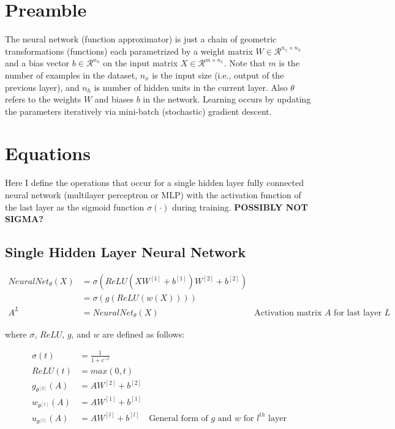 \documentclass{article}
\begin{document}
\section{Preamble}
The neural network
(function approximator) is just a chain of geometric transformations (functions)
each parametrized by a weight matrix $W \in \mathcal{R}^{n_x \times n_h}$ and
a bias vector $b \in \mathcal{R}^{n_h}$ on the input matrix $X \in \mathcal{R}^{m \times n_x}$.
Note that $m$ is the number of examples
in the dataset, $n_x$ is the input size (i.e., output of the previous layer),
and $n_h$ is number of hidden units in the current layer. Also $\theta$ refers
to the weights $W$ and biases ${b}$ in the network. Learning occurs by updating
the parameters iteratively via mini-batch (stochastic) gradient descent.

\section{Equations}
Here I define the operations that occur for a single hidden layer fully
connected neural network (multilayer perceptron or MLP) with the activation function of the last
layer as the sigmoid function $\sigma(\cdot)$ during training. \textbf{POSSIBLY NOT SIGMA?}

\subsection{Single Hidden Layer Neural Network}
\begin{equation}
	\begin{aligned}
		NeuralNet_{\theta}(X) & =
		\sigma(ReLU(XW^{[1]}
		+ {b}^{[1]})W^{[2]} + {b}^{[2]})                                                                  \\
		                      & = \sigma(g(ReLU(w(X))))                                                   \\
		A^{L}                 & = NeuralNet_{\theta}(X) & \text{Activation matrix $A$ for last layer $L$}
	\end{aligned}
\end{equation}

where $\sigma$, $ReLU$, $g$, and $w$ are defined as follows:

\begin{equation}
	\begin{aligned}
		\sigma(t)           & = \frac{1}{1 + e^{-t}}                                                         \\
		ReLU(t)             & = max(0, t)                                                                    \\
		g_{\theta^{[2]}}(A) & = AW^{[2]} + {b}^{[2]}                                                         \\
		w_{\theta^{[1]}}(A) & = AW^{[1]} + {b}^{[1]}                                                         \\
		u_{\theta^{[l]}}(A) & = AW^{[l]} + b^{[l]}   & \text{General form of $g$ and $w$ for $l^{th}$ layer}
	\end{aligned}
\end{equation}
\end{document}

